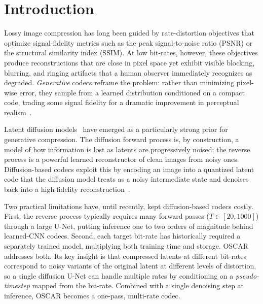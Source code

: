 \documentclass[conference]{IEEEtran}
\begin{document}
\section{Introduction}
\label{sec:intro}

Lossy image compression has long been guided by rate-distortion objectives that
optimize signal-fidelity metrics such as the peak signal-to-noise ratio (PSNR)
or the structural similarity index (SSIM). At low bit-rates, however, these
objectives produce reconstructions that are close in pixel space yet exhibit
visible blocking, blurring, and ringing artifacts that a human observer
immediately recognizes as degraded. \emph{Generative} codecs reframe the
problem: rather than minimizing pixel-wise error, they sample from a learned
distribution conditioned on a compact code, trading some signal fidelity for
a dramatic improvement in perceptual realism~\cite{hific}.

Latent diffusion models~\cite{ldm} have emerged as a particularly strong prior
for generative compression. The diffusion forward process is, by construction,
a model of how information is lost as latents are progressively noised; the
reverse process is a powerful learned reconstructor of clean images from noisy
ones. Diffusion-based codecs exploit this by encoding an image into a quantized
latent code that the diffusion model treats as a noisy intermediate state and
denoises back into a high-fidelity reconstruction~\cite{perco,codiff}.

Two practical limitations have, until recently, kept diffusion-based codecs
costly. First, the reverse process typically requires many forward passes
($T \in [20, 1000]$) through a large U-Net, putting inference one to two
orders of magnitude behind learned-CNN codecs. Second, each target bit-rate has
historically required a separately trained model, multiplying both training time
and storage. OSCAR~\cite{oscar} addresses both. Its key insight is that
compressed latents at different bit-rates correspond to noisy variants of the
original latent at different levels of distortion, so a single diffusion U-Net
can handle multiple rates by conditioning on a \emph{pseudo-timestep} mapped
from the bit-rate. Combined with a single denoising step at inference, OSCAR
becomes a one-pass, multi-rate codec.
\end{document}

